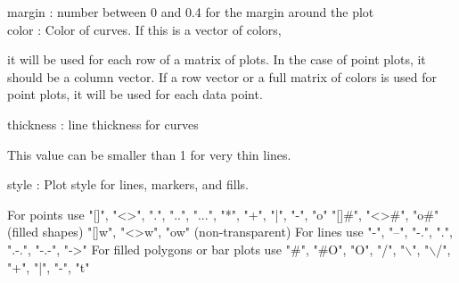 \documentclass[a4paper,10pt]{article}
\begin{document}
\begin{eulernotebook}
\begin{eulercomment}
\begin{eulercomment}
\begin{eulercomment}
\begin{eulercomment}
\begin{eulercomment}
\begin{eulercomment}
\begin{eulercomment}
\begin{eulercomment}
\begin{eulercomment}
\begin{eulercomment}
\begin{eulercomment}
\begin{eulercomment}
\begin{eulercomment}
\begin{eulercomment}
\begin{eulercomment}
\begin{eulercomment}
\begin{eulercomment}
\begin{eulercomment}
\begin{eulercomment}
\begin{eulercomment}
\begin{eulercomment}
\begin{eulercomment}
\begin{eulercomment}
\begin{eulercomment}
\begin{eulercomment}
\begin{eulercomment}
\begin{eulercomment}
\begin{eulercomment}
\begin{eulercomment}
\begin{eulercomment}
\begin{eulercomment}
\begin{eulercomment}
\begin{eulercomment}
\begin{eulercomment}
\begin{eulercomment}
\begin{eulercomment}
\begin{eulercomment}
margin    : number between 0 and 0.4 for the margin around the plot\\
color     : Color of curves. If this is a vector of colors,\\
\end{eulercomment}
\begin{eulerttcomment}
            it will be used for each row of a matrix of plots. In the case of
            point plots, it should be a column vector. If a row vector or a
            full matrix of colors is used for point plots, it will be used for
            each data point.
\end{eulerttcomment}
\begin{eulercomment}
thickness : line thickness for curves\\
\end{eulercomment}
\begin{eulerttcomment}
            This value can be smaller than 1 for very thin lines.
\end{eulerttcomment}
\begin{eulercomment}
style     : Plot style for lines, markers, and fills.\\
\end{eulercomment}
\begin{eulerttcomment}
            For points use
            "[]", "<>", ".", "..", "...",
            "*", "+", "|", "-", "o"
            "[]#", "<>#", "o#" (filled shapes)
            "[]w", "<>w", "ow" (non-transparent)
            For lines use
            "-", "--", "-.", ".", ".-.", "-.-", "->"
            For filled polygons or bar plots use
            "#", "#O", "O", "/", "\(\backslash\)", "\(\backslash\)/",
            "+", "|", "-", "t"
\end{eulerttcomment}

\end{eulercomment}
\end{eulercomment}
\end{eulercomment}
\end{eulercomment}
\end{eulercomment}
\end{eulercomment}
\end{eulercomment}
\end{eulercomment}
\end{eulercomment}
\end{eulercomment}
\end{eulercomment}
\end{eulercomment}
\end{eulercomment}
\end{eulercomment}
\end{eulercomment}
\end{eulercomment}
\end{eulercomment}
\end{eulercomment}
\end{eulercomment}
\end{eulercomment}
\end{eulercomment}
\end{eulercomment}
\end{eulercomment}
\end{eulercomment}
\end{eulercomment}
\end{eulercomment}
\end{eulercomment}
\end{eulercomment}
\end{eulercomment}
\end{eulercomment}
\end{eulercomment}
\end{eulercomment}
\end{eulercomment}
\end{eulercomment}
\end{eulercomment}
\end{eulercomment}
\end{eulernotebook}
\end{document}
